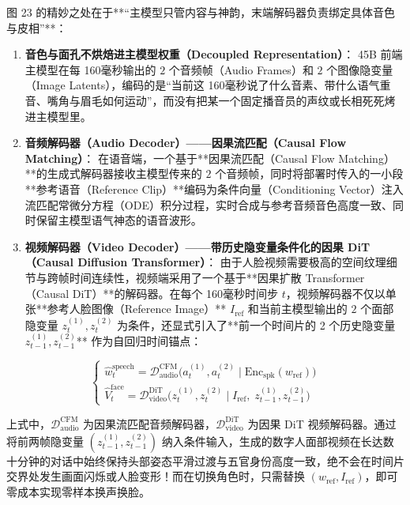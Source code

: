 \documentclass[a4paper]{article}
\begin{document}
图 23 的精妙之处在于**“主模型只管内容与神韵，末端解码器负责绑定具体音色与皮相”**：
\begin{enumerate}
    \item \textbf{音色与面孔不烘焙进主模型权重（Decoupled Representation）}：
    45B 前端主模型在每 160毫秒输出的 $2$ 个音频帧（Audio Frames）和 $2$ 个图像隐变量（Image Latents），编码的是“当前这 160毫秒说了什么音素、带什么语气重音、嘴角与眉毛如何运动”，而没有把某一个固定播音员的声纹或长相死死烤进主模型里。
    \item \textbf{音频解码器（Audio Decoder）——因果流匹配（Causal Flow Matching）}：
    在语音端，一个基于**因果流匹配（Causal Flow Matching）**的生成式解码器接收主模型传来的 $2$ 个音频帧，同时将部署时传入的一小段**参考语音（Reference Clip）**编码为条件向量（Conditioning Vector）注入流匹配常微分方程（ODE）积分过程，实时合成与参考音频音色高度一致、同时保留主模型语气神态的语音波形。
    \item \textbf{视频解码器（Video Decoder）——带历史隐变量条件化的因果 DiT（Causal Diffusion Transformer）}：
    由于人脸视频需要极高的空间纹理细节与跨帧时间连续性，视频端采用了一个基于**因果扩散 Transformer（Causal DiT）**的解码器。在每个 160毫秒时间步 $t$，视频解码器不仅以单张**参考人脸图像（Reference Image）** $I_{\mathrm{ref}}$ 和当前主模型输出的 $2$ 个面部隐变量 $z_t^{(1)}, z_t^{(2)}$ 为条件，还显式引入了**前一个时间片的 2 个历史隐变量 $z_{t-1}^{(1)}, z_{t-1}^{(2)}$** 作为自回归时间锚点：
\end{enumerate}

\begin{equation}
\begin{cases}
\hat{w}_t^{\mathrm{speech}} = \mathcal{D}_{\mathrm{audio}}^{\mathrm{CFM}}\Big(a_t^{(1)}, a_t^{(2)}\;\Big|\;\mathrm{Enc}_{\mathrm{spk}}(w_{\mathrm{ref}})\Big) \\[8pt]
\hat{V}_t^{\mathrm{face}} = \mathcal{D}_{\mathrm{video}}^{\mathrm{DiT}}\Big(z_t^{(1)}, z_t^{(2)}\;\Big|\;I_{\mathrm{ref}},\; z_{t-1}^{(1)}, z_{t-1}^{(2)}\Big)
\end{cases}
\end{equation}

上式中，$\mathcal{D}_{\mathrm{audio}}^{\mathrm{CFM}}$ 为因果流匹配音频解码器，$\mathcal{D}_{\mathrm{video}}^{\mathrm{DiT}}$ 为因果 DiT 视频解码器。通过将前两帧隐变量 $(z_{t-1}^{(1)}, z_{t-1}^{(2)})$ 纳入条件输入，生成的数字人面部视频在长达数十分钟的对话中始终保持头部姿态平滑过渡与五官身份高度一致，绝不会在时间片交界处发生画面闪烁或人脸变形！而在切换角色时，只需替换 $(w_{\mathrm{ref}}, I_{\mathrm{ref}})$，即可零成本实现零样本换声换脸。
\end{document}
